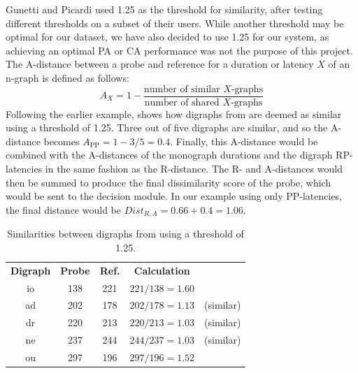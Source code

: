 Gunetti and Picardi \cite{gnp} used 1.25 as the threshold for similarity, after testing different thresholds on a subset of their users.
While another threshold may be optimal for our dataset, we have also decided to use 1.25 for our system, as achieving an optimal PA or CA performance was not the purpose of this project.
The A-distance between a probe and reference for a duration or latency $X$ of an n-graph is defined as follows: \begin{equation*}
    A_X = 1-\frac{\text{number of similar $X$-graphs}}{\text{number of shared $X$-graphs}}
\end{equation*}
Following the earlier example,  shows how digraphs from  are deemed as similar using a threshold of 1.25.
Three out of five digraphs are similar, and so the A-distance becomes $A_\text{{PP}} = 1-3/5 = 0.4$.
Finally, this A-distance would be combined with the A-distances of the monograph durations and the digraph RP-latencies in the same fashion as the R-distance.
The R- and A-distances would then be summed to produce the final dissimilarity score of the probe, which would be sent to the decision module.
In our example using only PP-latencies, the final distance  would be $Dist_{R,A} = 0.66 + 0.4 = 1.06$.

\begin{table}[h]
\centering
\begin{tabular}{ccccl}
 \bf Digraph & \bf Probe & \bf Ref. & \bf Calculation &  \\
 io & 138 & 221 & $221/138=1.60$ &  \\
 ad & 202 & 178 & $202/178=1.13$ & (similar) \\
 dr & 220 & 213 & $220/213=1.03$ & (similar) \\
 ne & 237 & 244 & $244/237=1.03$ & (similar) \\
 ou & 297 & 196 & $297/196=1.52$ & \\
\end{tabular}
\caption{Similarities between digraphs from  using a threshold of 1.25.}
\label{tab:A-distance-similar}
\end{table}

